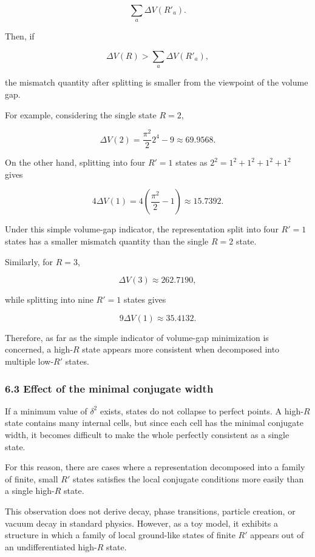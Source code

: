 \documentclass[
]{article}
\begin{document}
\[
\sum_a \Delta V(R'_a).
\]

Then, if

\[
\Delta V(R)>\sum_a\Delta V(R'_a),
\]

the mismatch quantity after splitting is smaller from the viewpoint of
the volume gap.

For example, considering the single state \(R=2\),

\[
\Delta V(2)=\frac{\pi^2}{2}2^4-9\approx69.9568.
\]

On the other hand, splitting into four \(R'=1\) states as
\(2^2=1^2+1^2+1^2+1^2\) gives

\[
4\Delta V(1)=4\left(\frac{\pi^2}{2}-1\right)\approx15.7392.
\]

Under this simple volume-gap indicator, the representation split into
four \(R'=1\) states has a smaller mismatch quantity than the single
\(R=2\) state.

Similarly, for \(R=3\),

\[
\Delta V(3)\approx262.7190,
\]

while splitting into nine \(R'=1\) states gives

\[
9\Delta V(1)\approx35.4132.
\]

Therefore, as far as the simple indicator of volume-gap minimization is
concerned, a high-\(R\) state appears more consistent when decomposed
into multiple low-\(R'\) states.

\subsubsection{6.3 Effect of the minimal conjugate
width}\label{effect-of-the-minimal-conjugate-width}

If a minimum value of \(\delta^2\) exists, states do not collapse to
perfect points. A high-\(R\) state contains many internal cells, but
since each cell has the minimal conjugate width, it becomes difficult to
make the whole perfectly consistent as a single state.

For this reason, there are cases where a representation decomposed into
a family of finite, small \(R'\) states satisfies the local conjugate
conditions more easily than a single high-\(R\) state.

This observation does not derive decay, phase transitions, particle
creation, or vacuum decay in standard physics. However, as a toy model,
it exhibits a structure in which a family of local ground-like states of
finite \(R'\) appears out of an undifferentiated high-\(R\) state.
\end{document}
